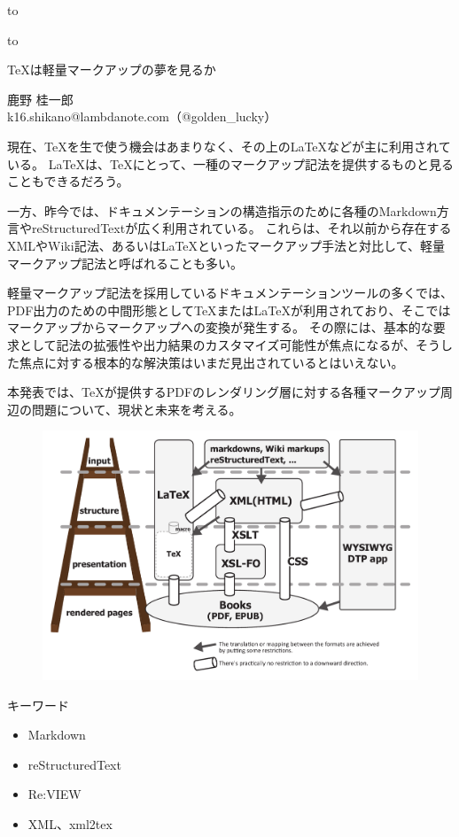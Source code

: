 \documentclass[uplatex,12pt,dvipdfmx]{jsarticle}
\begin{document}
\vspace*{-3\baselineskip}

\hbox to\textwidth{\small\hfil 2017年10月14日}\par
\hbox to\textwidth{\small\hfil \TeX ユーザの集い2017}

\vspace{\baselineskip}

\begin{center}\large
\TeX{}は軽量マークアップの夢を見るか
\end{center}

\begin{center}
\small
鹿野 桂一郎\\[0pt]
\footnotesize
k16.shikano@lambdanote.com（@golden\_lucky）
\end{center}

\vspace{\baselineskip}

現在、\TeX を生で使う機会はあまりなく、その上の\LaTeX などが主に利用されている。
\LaTeX は、\TeX にとって、一種のマークアップ記法を提供するものと見ることもできるだろう。

一方、昨今では、ドキュメンテーションの構造指示のために各種のMarkdown方言やreStructuredTextが広く利用されている。
これらは、それ以前から存在するXMLやWiki記法、あるいは\LaTeX といったマークアップ手法と対比して、軽量マークアップ記法と呼ばれることも多い。

軽量マークアップ記法を採用しているドキュメンテーションツールの多くでは、PDF出力のための中間形態として\TeX または\LaTeX が利用されており、そこではマークアップからマークアップへの変換が発生する。
その際には、基本的な要求として記法の拡張性や出力結果のカスタマイズ可能性が焦点になるが、そうした焦点に対する根本的な解決策はいまだ見出されているとはいえない。

本発表では、\TeX が提供するPDFのレンダリング層に対する各種マークアップ周辺の問題について、現状と未来を考える。

\vspace{\baselineskip}

\begin{figure}
\includegraphics[width=\hsize]{ladder.pdf}
\end{figure}

{\sffamily キーワード}
\begin{itemize}
\leftskip2em
\item Markdown
\item reStructuredText
\item Re:VIEW
\item XML、xml2tex
\end{itemize}
\end{document}
